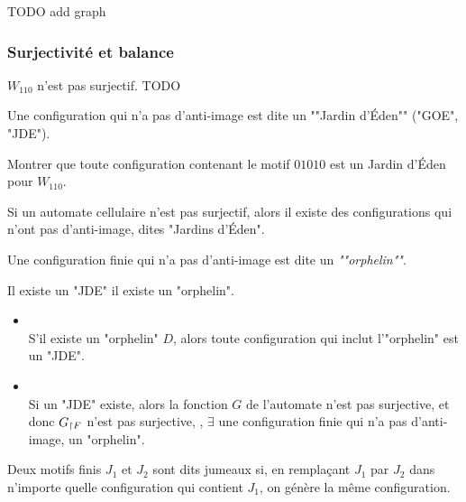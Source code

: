 TODO add graph

\subsubsection{Surjectivité et balance}

\begin{exemple}
	$W_{110}$ n'est pas surjectif. TODO
\end{exemple}

\begin{definition}
	Une configuration qui n'a pas d'anti-image est dite un ""Jardin d'Éden"" ("GOE", "JDE").
\end{definition}

\begin{exercice}
	Montrer que toute configuration contenant le motif $01010$ est un Jardin d'Éden pour $W_{110}$.
\end{exercice}

\begin{remarque}
	Si un automate cellulaire n'est pas surjectif, alors il existe des configurations qui n'ont pas d'anti-image, dites "Jardins d'Éden".
\end{remarque}

\begin{definition}
	Une configuration finie qui n'a pas d'anti-image est dite un \emph{""orphelin""}.
\end{definition}

\begin{prop}
	Il existe un "JDE" \ssi il existe un "orphelin".
\end{prop}


\begin{proofI}
	\begin{itemize}
		\item \bimpRL\\
		      S'il existe un "orphelin" $D$, alors toute configuration qui inclut l'"orphelin" est un "JDE".
		\item \bimpLR\\
		      Si un "JDE" existe, alors la fonction $G$ de l'automate n'est pas surjective, et donc $G_{\restriction F}$ n'est pas surjective,
		      \cad, $\exists$ une configuration finie qui n'a pas d'anti-image, \ie un "orphelin".
	\end{itemize}
\end{proofI}

\begin{definition}
	Deux motifs finis $J_1$ et $J_2$ sont dits jumeaux si, en remplaçant $J_1$ par $J_2$ dans
	n'importe quelle configuration qui contient $J_1$, on génère la même configuration.
\end{definition}

